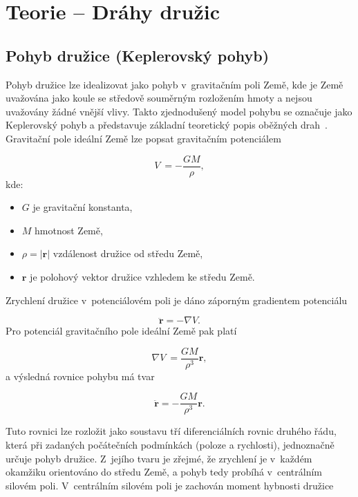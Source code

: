 \chapter{Teorie -- Dráhy družic}
\label{4-teorie-drahy-druzic}

\section{Pohyb družice (Keplerovský pohyb)}

Pohyb družice lze idealizovat jako pohyb v~gravitačním poli Země, kde je Země uvažována jako koule se středově souměrným rozložením hmoty a nejsou uvažovány žádné vnější vlivy. Takto zjednodušený model pohybu se označuje jako Keplerovský pohyb a představuje základní teoretický popis oběžných drah~\cite{bursa_kostelecky_1994}. Gravitační pole ideální Země lze popsat gravitačním potenciálem

\begin{equation}
V~= -\frac{GM}{\rho},
\end{equation}
kde:
\begin{itemize}
    \item $G$ je gravitační konstanta,
    \item $M$ hmotnost Země,
    \item $\rho = |\mathbf{r}|$ vzdálenost družice od středu Země,
    \item $\mathbf r$ je polohový vektor družice vzhledem ke středu Země.
\end{itemize}
Zrychlení družice v~potenciálovém poli je dáno záporným gradientem potenciálu

\begin{equation}
\ddot{\mathbf r} = - \nabla V.
\end{equation}
Pro potenciál gravitačního pole ideální Země pak platí

\begin{equation}
\nabla V~= \frac{GM}{\rho^3}\mathbf r,
\end{equation}
a výsledná rovnice pohybu má tvar

\begin{equation}
\ddot{\mathbf r} = -\frac{GM}{\rho^3}\mathbf r.
\end{equation}

Tuto rovnici lze rozložit jako soustavu tří diferenciálních rovnic druhého řádu, která při zadaných počátečních podmínkách (poloze a rychlosti), jednoznačně určuje pohyb družice. Z~jejího tvaru je zřejmé, že zrychlení je v~každém okamžiku orientováno do středu Země, a pohyb tedy probíhá v~centrálním silovém poli. V~centrálním silovém poli je zachován moment hybnosti družice

